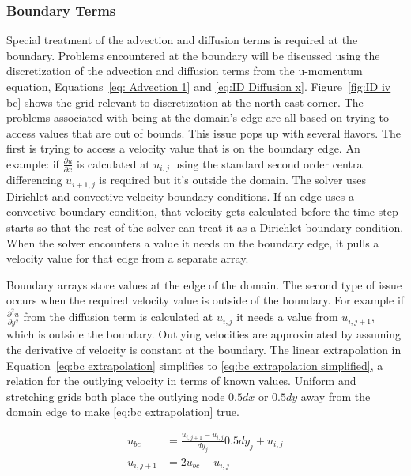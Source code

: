 \subsubsection{Boundary Terms}
\label{sec:ID NS boundary}
Special treatment of the advection and diffusion terms is required at the boundary. 
Problems encountered at the boundary will be discussed using the discretization of the advection and diffusion terms from the u-momentum equation, Equations~\eqref{eq: Advection 1} and \eqref{eq:ID Diffusion x}.
Figure~\ref{fig:ID iv bc} shows the grid relevant to discretization at the north east corner. 
The problems associated with being at the domain's edge are all based on trying to access values that are out of bounds. 
This issue pops up with several flavors. 
The first is trying to access a velocity value that is on the boundary edge. 
An example: if $\frac{\partial u}{\partial x}$ is calculated at $u_{i,j}$ using the standard second order central differencing $u_{i+1,j}$ is required but it's outside the domain. 
The solver uses Dirichlet and convective velocity boundary conditions. 
If an edge uses a convective boundary condition, that velocity gets calculated before the time step starts so that the rest of the solver can treat it as a Dirichlet boundary condition. 
When the solver encounters a value it needs on the boundary edge, it pulls a velocity value for that edge from a separate array. 

Boundary arrays store values at the edge of the domain. 
The second type of issue occurs when the required velocity value is outside of the boundary. 
For example if $\frac{\partial^2 u}{\partial y^2}$ from the diffusion term is calculated at $u_{i,j}$ it needs a value from $u_{i,j+1}$, which is outside the boundary. 
Outlying velocities are approximated by assuming the derivative of velocity is constant at the boundary. 
The linear extrapolation in Equation~\eqref{eq:bc extrapolation} simplifies to \eqref{eq:bc extrapolation simplified}, a relation for the outlying velocity in terms of known values. 
Uniform and stretching grids both place the outlying node $0.5dx$ or $0.5dy$ away from the domain edge to make \eqref{eq:bc extrapolation} true. 

\begin{align}
u_{bc} &= \frac{u_{i,j+1} - u_{i,j}}{dy_j}0.5dy_j+ u_{i,j} \label{eq:bc extrapolation} \\
u_{i,j+1} &= 2u_{bc} - u_{i,j} \; \label{eq:bc extrapolation simplified}
\end{align}

